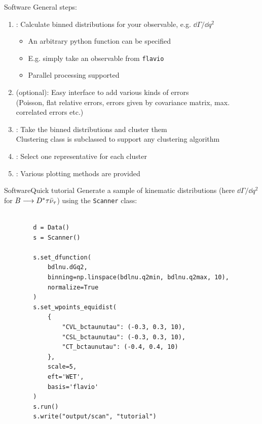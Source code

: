 \begin{frame}{Software}
    General steps:
    \begin{enumerate}
        \item {}: Calculate binned distributions for your observable, e.g. $\dd\Gamma/\dd q^2$
        \begin{itemize}
            \item An arbitrary python function can be specified
            \item E.g. simply take an observable from \texttt{flavio}
            \item Parallel processing supported
        \end{itemize}
        \item {} (optional): Easy interface to add various kinds of errors\\
         {\footnotesize(Poisson, flat relative errors, errors given by covariance matrix, max. correlated errors etc.)}
        \item {}: Take the binned distributions and cluster them\\
        {\footnotesize Clustering class is subclassed to support any clustering algorithm}
        \item {}: Select one representative for each cluster
        \item {}: Various plotting methods are provided
    \end{enumerate}
\end{frame}

\begin{frame}[fragile]{Software}{Quick tutorial}
    Generate a sample of kinematic distributions (here $\dd\Gamma/\dd q^2$ for $B\longrightarrow D^*\tau\bar\nu_\tau$) using the \texttt{Scanner} class:
    
    \begin{verbatim}
    
        d = Data()
        s = Scanner()
        
        s.set_dfunction(
            bdlnu.dGq2,
            binning=np.linspace(bdlnu.q2min, bdlnu.q2max, 10),
            normalize=True
        )
        s.set_wpoints_equidist(
            {
                "CVL_bctaunutau": (-0.3, 0.3, 10),
                "CSL_bctaunutau": (-0.3, 0.3, 10),
                "CT_bctaunutau": (-0.4, 0.4, 10)
            },
            scale=5,
            eft='WET',
            basis='flavio'
        )
        s.run()
        s.write("output/scan", "tutorial")
    \end{verbatim}

\end{frame}

